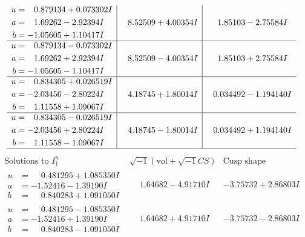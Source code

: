 \documentclass[1p]{elsarticle_modified}
\theoremstyle{definition}
\newcommand{\I}{\sqrt{-1}}
\begin{document}
$$\begin{array}{c|c|c}
\begin{aligned}
u &= \phantom{-}0.879134 + 0.073302 I \\
a &= \phantom{-}1.69262 - 2.92394 I \\
b &= -1.05605 + 1.10417 I\end{aligned}
 & \phantom{-}8.52509 + 4.00354 I & \phantom{-}1.85103 - 2.75584 I \\ \hline\begin{aligned}
u &= \phantom{-}0.879134 - 0.073302 I \\
a &= \phantom{-}1.69262 + 2.92394 I \\
b &= -1.05605 - 1.10417 I\end{aligned}
 & \phantom{-}8.52509 - 4.00354 I & \phantom{-}1.85103 + 2.75584 I \\ \hline\begin{aligned}
u &= \phantom{-}0.834305 + 0.026519 I \\
a &= -2.03456 - 2.80224 I \\
b &= \phantom{-}1.11558 + 1.09067 I\end{aligned}
 & \phantom{-}4.18745 + 1.80014 I & \phantom{-}0.034492 - 1.194140 I \\ \hline\begin{aligned}
u &= \phantom{-}0.834305 - 0.026519 I \\
a &= -2.03456 + 2.80224 I \\
b &= \phantom{-}1.11558 - 1.09067 I\end{aligned}
 & \phantom{-}4.18745 - 1.80014 I & \phantom{-}0.034492 + 1.194140 I\\
 \hline 
 \end{array}$$\newpage$$\begin{array}{c|c|c}  
\text{Solutions to }I^u_{1}& \I (\text{vol} + \sqrt{-1}CS) & \text{Cusp shape}\\
 \hline 
\begin{aligned}
u &= \phantom{-}0.481295 + 1.085350 I \\
a &= -1.52416 - 1.39190 I \\
b &= \phantom{-}0.840283 + 1.091050 I\end{aligned}
 & \phantom{-}1.64682 - 4.91710 I & -3.75732 + 2.86803 I \\ \hline\begin{aligned}
u &= \phantom{-}0.481295 - 1.085350 I \\
a &= -1.52416 + 1.39190 I \\
b &= \phantom{-}0.840283 - 1.091050 I\end{aligned}
 & \phantom{-}1.64682 + 4.91710 I & -3.75732 - 2.86803 I \\ \hline\begin{aligned}

\end{aligned}
\end{array}$$
\end{document}
